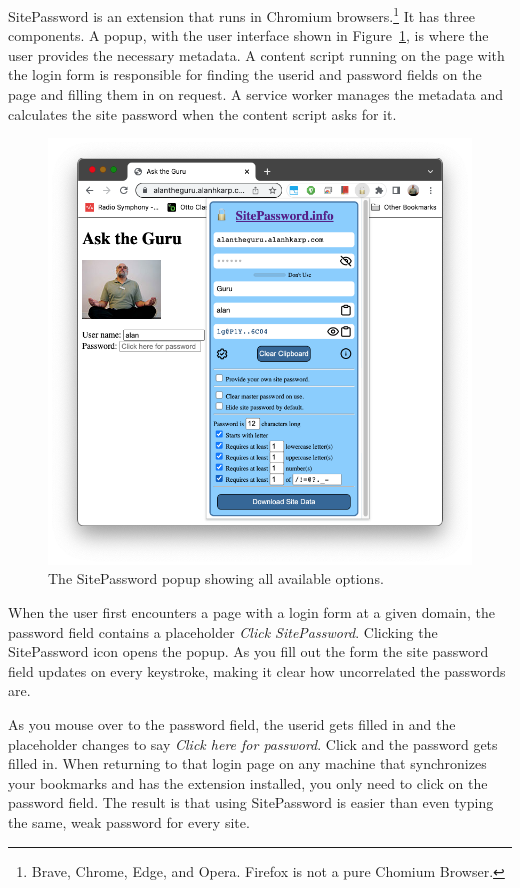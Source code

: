 SitePassword is an extension that runs in Chromium browsers.\footnote{Brave, Chrome, Edge, and Opera.  Firefox is not a pure Chomium Browser.}  It has three components.  A popup, with the user interface shown in Figure~\ref{fig:popup}, is where the user provides the necessary metadata.  A content script running on the page with the login form is responsible for finding the userid and password fields on the page and filling them in on request.  A service worker manages the metadata and calculates the site password when the content script asks for it.  

\begin{figure}
\begin{center}
  \includegraphics[scale=0.30]{soupsfig1.png}
\end{center}
\caption{\label{fig:popup} The SitePassword popup showing all available
options. }
\end{figure}

When the user first encounters a page with a login form at a given domain, the password field contains a placeholder {\em Click SitePassword}.  Clicking the SitePassword icon opens the popup.  As you fill out the form the site password field updates on every keystroke, making it clear how uncorrelated the passwords are.

As you  mouse over to the password field, the userid gets filled in and the placeholder changes to say {\em Click here for password}.  Click and the password gets filled in.  When returning to that login page on any machine that synchronizes your bookmarks and has the extension installed, you only need to click on the password field.  The result is that using SitePassword is easier than even typing the same, weak password for every site.

